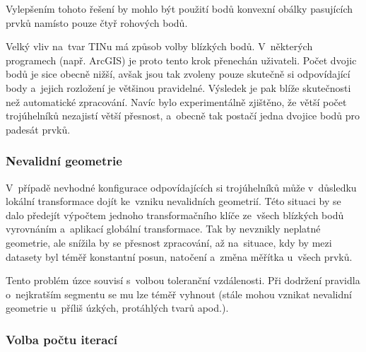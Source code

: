 Vylepšením tohoto řešení by mohlo být použití bodů konvexní obálky pasujících
prvků namísto pouze čtyř rohových bodů.

Velký vliv na~tvar TINu má způsob volby blízkých bodů. V~některých programech
(např. ArcGIS) je proto tento krok přenechán uživateli. Počet dvojic bodů je
sice obecně nižší, avšak jsou tak zvoleny pouze skutečně si odpovídající body
a~jejich rozložení je většinou pravidelné. Výsledek je pak blíže skutečnosti
než automatické zpracování. Navíc bylo experimentálně zjištěno, že větší počet
trojúhelníků nezajistí větší přesnost, a~obecně tak postačí jedna dvojice
bodů pro padesát prvků. %

\subsubsection{Nevalidní geometrie}

V~případě nevhodné konfigurace odpovídajících si trojúhelníků může v~důsledku
lokální transformace dojít ke~vzniku nevalidních geometrií. Této situaci by se
dalo předejít výpočtem jednoho transformačního klíče ze~všech blízkých bodů
vyrovnáním a~aplikací globální transformace. Tak by nevznikly neplatné geometrie,
ale snížila by se přesnost zpracování, až na~situace, kdy by mezi datasety byl
téměř konstantní posun, natočení a~změna měřítka u~všech prvků.


Tento problém úzce souvisí s~volbou toleranční vzdálenosti. Při dodržení pravidla
o~nejkratším segmentu  se mu lze téměř vyhnout (stále mohou vznikat nevalidní 
geometrie u~příliš úzkých, protáhlých tvarů apod.). 


\subsubsection{Volba počtu iterací}

